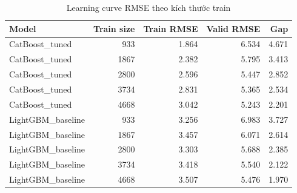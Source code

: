 \begin{table}[H]
\centering
\caption{Learning curve RMSE theo kích thước train}
\label{tab:learning-curve-summary}
\footnotesize
\setlength{\tabcolsep}{5pt}
\renewcommand{\arraystretch}{0.92}
\begin{tabular}{lrrrr}
\toprule
Model & Train size & Train RMSE & Valid RMSE & Gap \\
\midrule
CatBoost\_tuned & 933 & 1.864 & 6.534 & 4.671 \\
CatBoost\_tuned & 1867 & 2.382 & 5.795 & 3.413 \\
CatBoost\_tuned & 2800 & 2.596 & 5.447 & 2.852 \\
CatBoost\_tuned & 3734 & 2.831 & 5.365 & 2.534 \\
CatBoost\_tuned & 4668 & 3.042 & 5.243 & 2.201 \\
LightGBM\_baseline & 933 & 3.256 & 6.983 & 3.727 \\
LightGBM\_baseline & 1867 & 3.457 & 6.071 & 2.614 \\
LightGBM\_baseline & 2800 & 3.303 & 5.688 & 2.385 \\
LightGBM\_baseline & 3734 & 3.418 & 5.540 & 2.122 \\
LightGBM\_baseline & 4668 & 3.507 & 5.476 & 1.970 \\
\bottomrule
\end{tabular}
\end{table}
